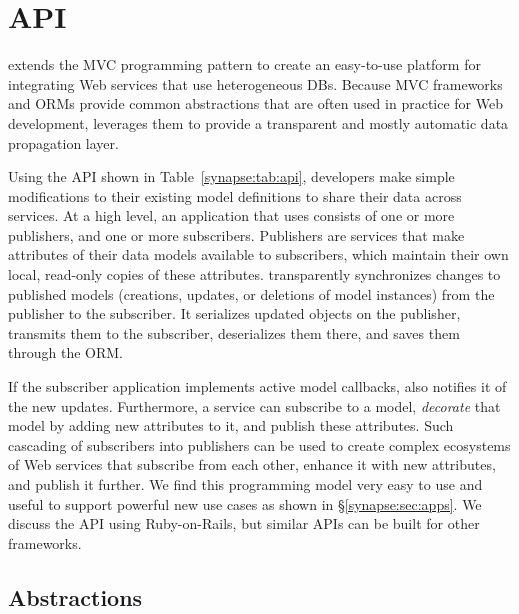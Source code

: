 \setlength{\tabcolsep}{4pt}
\section{\synapse API}
\label{synapse:sec:programming-model}

\synapse extends the MVC programming pattern to create an
easy-to-use platform for integrating Web services that use
heterogeneous DBs.  
Because MVC frameworks and ORMs provide common abstractions that are
often used in practice for Web development, \synapse
leverages them to provide a transparent and mostly automatic data
propagation layer.

Using the \synapse API shown in Table~\ref{synapse:tab:api}, developers make
simple modifications to their existing model definitions to share their data
across services. At a high
level, an application that uses \synapse consists of one or more publishers,
and one or more subscribers. Publishers are services that make attributes of
their data models available to subscribers, which maintain their own local,
read-only copies of these attributes. \synapse transparently
synchronizes changes to published models (creations, updates, or deletions of
model instances) from the publisher to the subscriber.  It serializes
updated objects on the publisher, transmits them to the subscriber, deserializes
them there, and saves them through the ORM.

If the subscriber application implements active model callbacks,
\synapse also notifies it of the new updates.  Furthermore, a service can
subscribe to a model, \emph{decorate} that model by adding new
attributes to it, and publish these attributes. Such cascading
of subscribers into publishers can be used to create complex
ecosystems of Web services that subscribe from each other, enhance it
with new attributes, and publish it further.  We find this
programming model very easy to use and useful to support powerful new use
cases as shown in \S\ref{synapse:sec:apps}.
We discuss the \synapse API using Ruby-on-Rails, but similar APIs can be
built for other frameworks.

\subsection{\synapse Abstractions}
\label{synapse:sec:api}

\begingroup
\setlength{\columnsep}{6pt}


